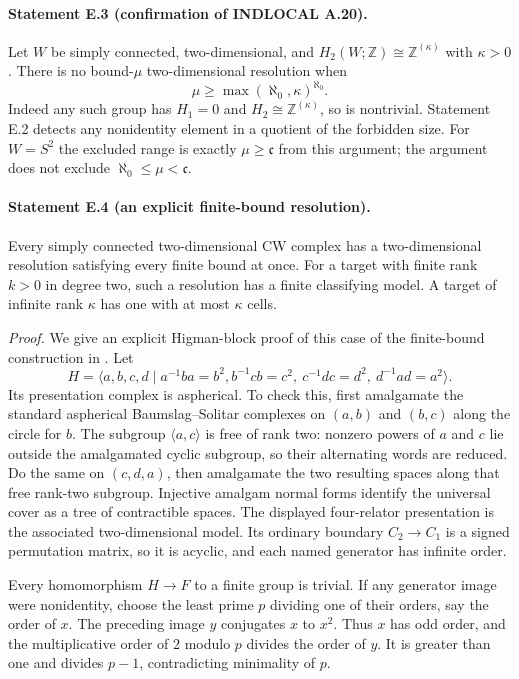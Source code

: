 \paragraph{Statement E.3 (confirmation of INDLOCAL A.20).}
Let $W$ be simply connected, two-dimensional, and
$H_2(W;\mathbb Z)\cong\mathbb Z^{(\kappa)}$ with $\kappa>0$.
There is no bound-$\mu$ two-dimensional resolution when
\[
 \mu\geq \max(\aleph_0,\kappa)^{\aleph_0}.
\]
Indeed any such group has $H_1=0$ and $H_2\cong\mathbb Z^{(\kappa)}$,
so is nontrivial. Statement E.2 detects any nonidentity element in
a quotient of the forbidden size. For $W=S^2$ the excluded range
is exactly $\mu\geq\mathfrak c$ from this argument; the argument
does not exclude $\aleph_0\leq\mu<\mathfrak c$.

\paragraph{Statement E.4 (an explicit finite-bound resolution).}
Every simply connected two-dimensional CW complex has a
two-dimensional resolution satisfying every finite bound at once.
For a target with finite rank $k>0$ in degree two, such a resolution
has a finite classifying model. A target of infinite rank $\kappa$
has one with at most $\kappa$ cells.

\emph{Proof.}
We give an explicit Higman-block proof of this case of the
finite-bound construction in \cite[Sections~8--10]{EBaumslagDyerHeller1980}.
Let
\[
 H=\langle a,b,c,d\mid a^{-1}ba=b^2,
 b^{-1}cb=c^2,\ c^{-1}dc=d^2,\ d^{-1}ad=a^2\rangle.
\]
Its presentation complex is aspherical. To check this, first
amalgamate the standard aspherical Baumslag--Solitar complexes on
$(a,b)$ and $(b,c)$ along the circle for $b$. The subgroup
$\langle a,c\rangle$ is free of rank two: nonzero powers of
$a$ and $c$ lie outside the amalgamated cyclic subgroup, so their
alternating words are reduced. Do the same on $(c,d,a)$, then
amalgamate the two resulting spaces along that free rank-two
subgroup. Injective amalgam normal forms identify the universal
cover as a tree of contractible spaces. The displayed four-relator
presentation is the associated two-dimensional model. Its ordinary
boundary $C_2\to C_1$ is a signed permutation matrix, so it is
acyclic, and each named generator has infinite order.

Every homomorphism $H\to F$ to a finite group is trivial. If any
generator image were nonidentity, choose the least prime $p$
dividing one of their orders, say the order of $x$. The preceding
image $y$ conjugates $x$ to $x^2$. Thus $x$ has odd order, and
the multiplicative order of $2$ modulo $p$ divides the order of
$y$. It is greater than one and divides $p-1$, contradicting
minimality of $p$.

